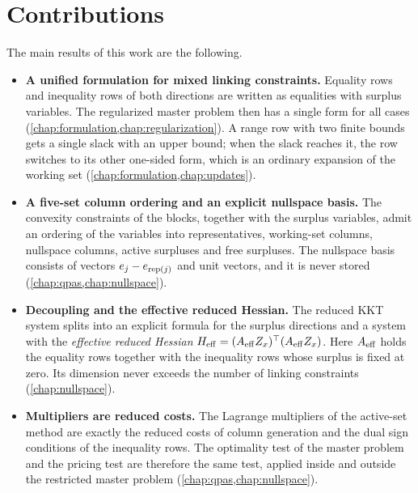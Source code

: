 \section{Contributions}

The main results of this work are the following.

\begin{itemize}
    \item \textbf{A unified formulation for mixed linking constraints.} Equality rows and
          inequality rows of both directions are written as equalities with surplus
          variables. The regularized master problem then has a single form for all cases
          (\cref{chap:formulation,chap:regularization}). A range row with two finite bounds gets a
          single slack with an upper bound; when the slack reaches it, the row switches
          to its other one-sided form, which is an ordinary expansion of the working set
          (\cref{chap:formulation,chap:updates}).

    \item \textbf{A five-set column ordering and an explicit nullspace basis.} The convexity
          constraints of the blocks, together with the surplus variables, admit an ordering
          of the variables into representatives, working-set columns, nullspace columns,
          active surpluses and free surpluses. The nullspace basis consists of vectors
          $e_j - e_{\operatorname{rep}(j)}$ and unit vectors, and it is never stored
          (\cref{chap:qpas,chap:nullspace}).

    \item \textbf{Decoupling and the effective reduced Hessian.} The reduced KKT system splits
          into an explicit formula for the surplus directions and a system with the
          \emph{effective reduced Hessian} $H_{\mathrm{eff}} = (A_{\mathrm{eff}} Z_x)^\top(A_{\mathrm{eff}} Z_x)$. Here $A_{\mathrm{eff}}$
          holds the equality rows together with the inequality rows whose surplus is fixed at
          zero. Its dimension never exceeds the number of linking constraints
          (\cref{chap:nullspace}).

    \item \textbf{Multipliers are reduced costs.} The Lagrange multipliers of the active-set
          method are exactly the reduced costs of column generation and the dual sign
          conditions of the inequality rows. The optimality test of the master problem and
          the pricing test are therefore the same test, applied inside and outside the
          restricted master problem (\cref{chap:qpas,chap:nullspace}).


\end{itemize}
